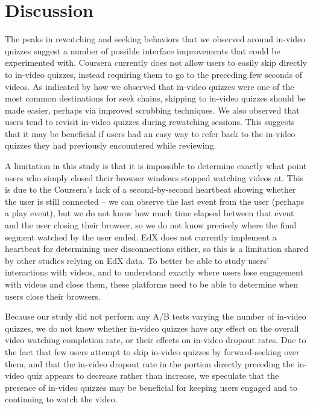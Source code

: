 \documentclass{sigchi}
\begin{document}
\section{Discussion}

The peaks in rewatching and seeking behaviors that we observed around in-video quizzes suggest a number of possible interface improvements that could be experimented with. Coursera currently does not allow users to easily skip directly to in-video quizzes, instead requiring them to go to the preceding few seconds of videos. As indicated by how we observed that in-video quizzes were one of the most common destinations for seek chains, skipping to in-video quizzes should  be made easier, perhaps via improved scrubbing techniques. We also observed that users tend to revisit in-video quizzes during rewatching sessions. This suggests that it may be beneficial if users had an easy way to refer back to the in-video quizzes they had previously encountered while reviewing.

A limitation in this study is that it is impossible to determine exactly what point users who simply closed their browser windows stopped watching videos at. This is due to the Coursera's lack of a second-by-second heartbeat showing whether the user is still connected -- we can observe the last event from the user (perhaps a play event), but we do not know how much time elapsed between that event and the user closing their browser, so we do not know precisely where the final segment watched by the user ended. EdX does not currently implement a heartbeat for determining user disconnections either, so this is a limitation shared by other studies relying on EdX data. To better be able to study users' interactions with videos, and to understand exactly where users lose engagement with videos and close them, these platforms need to be able to determine when users close their browsers.

Because our study did not perform any A/B tests varying the number of in-video quizzes, we do not know whether in-video quizzes have any effect on the overall video watching completion rate, or their effects on in-video dropout rates. Due to the fact that few users attempt to skip in-video quizzes by forward-seeking over them, and that the in-video dropout rate in the portion directly preceding the in-video quiz appears to decrease rather than increase, we speculate that the presence of in-video quizzes may be beneficial for keeping users engaged and to continuing to watch the video.
\end{document}
